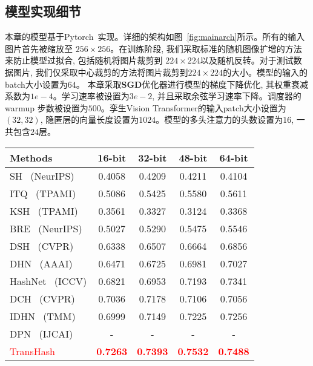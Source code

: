 \subsection{模型实现细节}
本章的模型基于Pytorch~\cite{paszke2019pytorch}实现。详细的架构如图~\ref{fig:mainarch}所示。所有的输入图片首先被缩放至 $256 \times 256$。在训练阶段, 我们采取标准的随机图像扩增的方法来防止模型过拟合, 包括随机将图片裁剪到 $224 \times 224$以及随机反转。对于测试数据图片, 我们仅采取中心裁剪的方法将图片裁剪到$224 \times 224$的大小。模型的输入的batch大小设置为$64$。 本章采取\textbf{SGD}优化器进行模型的梯度下降优化, 其权重衰减系数为$1e-4$。学习速率被设置为$3e-2$, 并且采取余弦学习速率下降。调度器的warmup 步数被设置为$500$。孪生Vision Transformer的输入patch大小设置为$(32, 32)$, 隐匿层的向量长度设置为$1024$。模型的多头注意力的头数设置为$16$, 一共包含$24$层。
\begin{table}[!htpb]
    \centering
    \begin{tabular}{cccccc}
       \\ \hline
    \multicolumn{2}{l|}{Methods} & 16-bit & 32-bit & 48-bit & 64-bit   \\\hline
    \multicolumn{2}{l|}{SH~\cite{weiss2008spectral} (NeurIPS)} & 0.4058 & 0.4209  & 0.4211 & 0.4104  \\  
    \multicolumn{2}{l|}{ITQ~\cite{gong2012iterative} (TPAMI)} & 0.5086 & 0.5425 & 0.5580 & 0.5611  \\  
    \multicolumn{2}{l|}{KSH~\cite{liu2012supervised} (TPAMI)} & 0.3561 & 0.3327 & 0.3124 & 0.3368  \\  
    \multicolumn{2}{l|}{BRE~\cite{kulis2009learning} (NeurIPS)} & 0.5027 & 0.5290 & 0.5475 & 0.5546  \\  
    \hline
    \hline
    \multicolumn{2}{l|}{DSH~\cite{liu2016deep} (CVPR)} & 0.6338 & 0.6507 & 0.6664 & 0.6856  \\
    \multicolumn{2}{l|}{DHN~\cite{zhu2016deep} (AAAI)} & 0.6471 & 0.6725 & 0.6981 & 0.7027  \\
    \multicolumn{2}{l|}{HashNet~\cite{cao2017hashnet} (ICCV)} & 0.6821 & 0.6953 & 0.7193 & 0.7341  \\
    \multicolumn{2}{l|}{DCH~\cite{cao2018deep} (CVPR)} & 0.7036 & 0.7178 & 0.7106 & 0.7056  \\
    \multicolumn{2}{l|}{IDHN~\cite{cao2018deep} (TMM)} & 0.6999 & 0.7149 & 0.7225 & 0.7256  \\
    \multicolumn{2}{l|}{DPN~\cite{fan2020deep} (IJCAI)} & - & - & - & -  \\
    \hline
    \hline
     \multicolumn{2}{l|}{\textcolor{red}{TransHash} }&\textcolor{red}{\textbf{0.7263}} & \textcolor{red}{\textbf{0.7393}} & \textcolor{red}{\textbf{0.7532}} & \textcolor{red}{\textbf{0.7488}} \\
     \hline
     \hline
    \end{tabular}
    \label{table:nuswide}
  \end{table}


